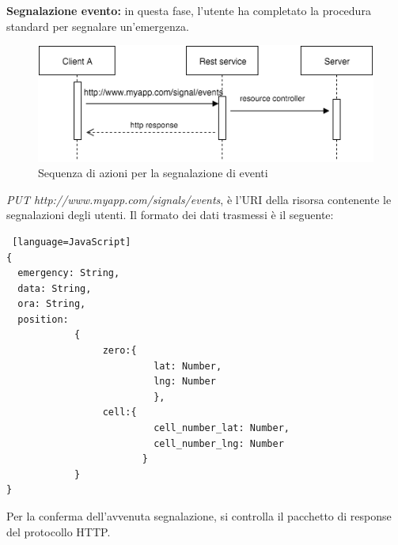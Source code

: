 \textbf{Segnalazione evento:} in questa fase, l'utente ha completato la procedura standard per segnalare un'emergenza. 
 \begin{figure}[H]
	\centering
	\includegraphics[scale=0.8]{Implementazione/signal.png}
	\caption{Sequenza di azioni per la segnalazione di eventi }
	\label{fig:sig}
\end{figure}
 \textit{PUT http://www.myapp.com/signals/events}, è l'URI della risorsa contenente le segnalazioni degli utenti. Il formato dei dati trasmessi è il seguente:
\begin{lstlisting} [language=JavaScript]
{
  emergency: String,
  data: String,
  ora: String,
  position: 
			{
			     zero:{
			              lat: Number,
			              lng: Number
			              },
			     cell:{
			              cell_number_lat: Number,
			              cell_number_lng: Number
			            }
			}
}
\end{lstlisting}
Per la conferma dell'avvenuta segnalazione, si controlla il pacchetto di response del protocollo HTTP. 
